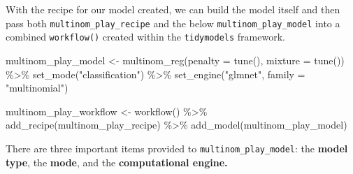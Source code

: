 \documentclass[
  letterpaper,
]{krantz}
\newenvironment{Shaded}{\begin{snugshade}}{\end{snugshade}}
\newcommand{\AttributeTok}[1]{\textcolor[rgb]{0.40,0.45,0.13}{#1}}
\newcommand{\FunctionTok}[1]{\textcolor[rgb]{0.28,0.35,0.67}{#1}}
\newcommand{\NormalTok}[1]{\textcolor[rgb]{0.00,0.23,0.31}{#1}}
\newcommand{\OtherTok}[1]{\textcolor[rgb]{0.00,0.23,0.31}{#1}}
\newcommand{\SpecialCharTok}[1]{\textcolor[rgb]{0.37,0.37,0.37}{#1}}
\newcommand{\StringTok}[1]{\textcolor[rgb]{0.13,0.47,0.30}{#1}}
\begin{document}
With the recipe for our model created, we can build the model itself and
then pass both \texttt{multinom\_play\_recipe} and the below
\texttt{multinom\_play\_model} into a combined \texttt{workflow()}
created within the \texttt{tidymodels} framework.

\begin{Shaded}
\begin{Highlighting}[]
\NormalTok{multinom\_play\_model }\OtherTok{\textless{}{-}}
  \FunctionTok{multinom\_reg}\NormalTok{(}\AttributeTok{penalty =} \FunctionTok{tune}\NormalTok{(), }\AttributeTok{mixture =} \FunctionTok{tune}\NormalTok{()) }\SpecialCharTok{\%\textgreater{}\%}
  \FunctionTok{set\_mode}\NormalTok{(}\StringTok{"classification"}\NormalTok{) }\SpecialCharTok{\%\textgreater{}\%}
  \FunctionTok{set\_engine}\NormalTok{(}\StringTok{"glmnet"}\NormalTok{, }\AttributeTok{family =} \StringTok{"multinomial"}\NormalTok{)}

\NormalTok{multinom\_play\_workflow }\OtherTok{\textless{}{-}} \FunctionTok{workflow}\NormalTok{() }\SpecialCharTok{\%\textgreater{}\%}
  \FunctionTok{add\_recipe}\NormalTok{(multinom\_play\_recipe) }\SpecialCharTok{\%\textgreater{}\%}
  \FunctionTok{add\_model}\NormalTok{(multinom\_play\_model)}
\end{Highlighting}
\end{Shaded}

There are three important items provided to
\texttt{multinom\_play\_model}: the \textbf{model type}, the
\textbf{mode}, and the \textbf{computational engine.}
\end{document}
